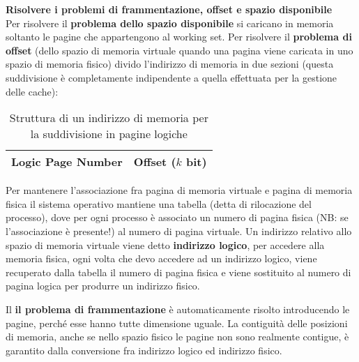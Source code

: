 \begin{exmp}
    \textbf{Risolvere i problemi di frammentazione, offset e spazio disponibile}
    \\
    Per risolvere il \textbf{problema dello spazio disponibile} si caricano in
    memoria soltanto le pagine che appartengono al working set. Per risolvere il
    \textbf{problema di offset} (dello spazio di memoria virtuale quando una
    pagina viene caricata in uno spazio di memoria fisico) divido l'indirizzo di
    memoria in due sezioni (questa suddivisione è completamente indipendente a
    quella effettuata per la gestione delle cache):

    \begin{table}[htbp]
        \centering
        \caption{Struttura di un indirizzo di memoria per la suddivisione in pagine logiche}
        \label{tab:addr-logicpage}
        \begin{tabular}{|l|l|}
        \hline
        Logic Page Number & Offset ($k$ bit) \\ \hline
        \end{tabular}
    \end{table}

    Per mantenere l'associazione fra pagina di memoria virtuale e pagina di
    memoria fisica il sistema operativo mantiene una tabella (detta di
    rilocazione del processo), dove per ogni processo è associato un numero di
    pagina fisica (NB: se l'associazione è presente!) al numero di pagina
    virtuale. Un indirizzo relativo allo spazio di memoria virtuale viene detto
    \textbf{indirizzo logico}, per accedere alla memoria fisica, ogni volta che
    devo accedere ad un indirizzo logico, viene recuperato dalla tabella il
    numero di pagina fisica e viene sostituito al numero di pagina logica per
    produrre un indirizzo fisico.

    Il \textbf{il problema di frammentazione} è automaticamente risolto
    introducendo le pagine, perché esse hanno tutte dimensione uguale. La
    contiguità delle posizioni di memoria, anche se nello spazio fisico le
    pagine non sono realmente contigue, è garantito dalla conversione fra
    indirizzo logico ed indirizzo fisico.
\end{exmp}

